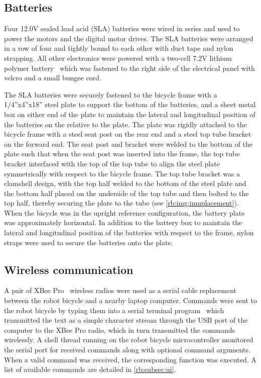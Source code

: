 \subsection{Batteries} \label{rb:subsec:batteries}
Four 12.0V sealed lead acid (SLA) batteries were wired in series and used to
power the motors and the digital motor drives. The SLA batteries were arranged
in a row of four and tightly bound to each other with duct tape and nylon
strapping. All other electronics were powered with a two-cell 7.2V lithium
polymer battery~\cite{Zippy5000} which was fastened to the right side of the
electrical panel with velcro and a small bungee cord.

The SLA batteries were securely fastened to the bicycle frame with a
1/4''x4''x18'' steel plate to support the bottom of the batteries, and a sheet
metal box on either end of the plate to maintain the lateral and longitudinal
position of the batteries on the relative to the plate. The plate was rigidly
attached to the bicycle frame with a steel seat post on the rear end and a
steel top tube bracket on the forward end. The seat post and bracket were
welded to the bottom of the plate such that when the seat post was inserted
into the frame, the top tube bracket interfaced with the top of the top tube to
align the steel plate symmetrically with respect to the bicycle frame. The top
tube bracket was a clamshell design, with the top half welded to the bottom of
the steel plate and the bottom half placed on the underside of the top tube and
then bolted to the top half, thereby securing the plate to the tube (see
\autoref{rb:img:imuplacement}). When the bicycle was in the upright reference 
configuration, the battery plate was approximately horizontal. In addition to
the battery box to maintain the lateral and longitudinal position of the
batteries with respect to the frame, nylon straps were used to secure the
batteries onto the plate.

\subsection{Wireless communication} \label{rb:subsec:wireless}
A pair of XBee Pro~\cite{XBeePro} wireless radios were used as a serial cable
replacement between the robot bicycle and a nearby laptop computer. Commands
were sent to the robot bicycle by typing them into a serial terminal
program~\cite{moserial} which transmitted the text as a simple character stream
through the USB port of the computer to the XBee Pro radio, which in turn
transmitted the commands wirelessly. A shell thread running on the robot
bicycle microcontroller monitored the serial port for received commands along
with optional command arguments. When a valid command was received, the
corresponding function was executed. A list of available commands are detailed
in \autoref{rb:subsec:ui}.


